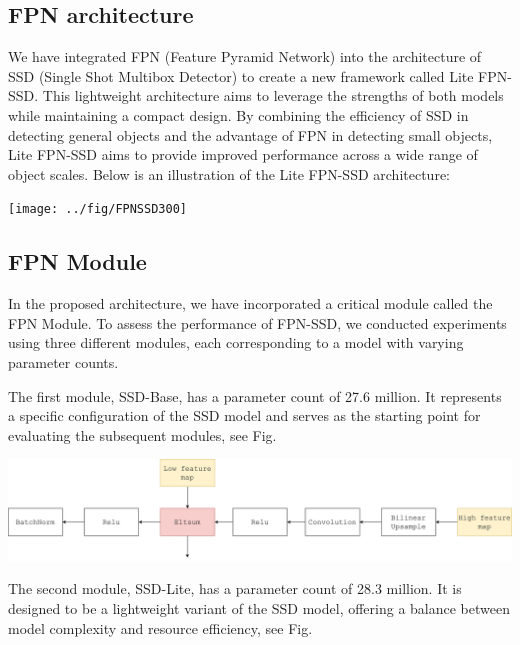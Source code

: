 \documentclass[a4paper]{article}
\begin{document}
	\subsection{FPN architecture}
	
	We have integrated FPN (Feature Pyramid Network) into the architecture of SSD (Single Shot Multibox Detector) to create a new framework called Lite FPN-SSD. This lightweight architecture aims to leverage the strengths of both models while maintaining a compact design. By combining the efficiency of SSD in detecting general objects and the advantage of FPN in detecting small objects, Lite FPN-SSD aims to provide improved performance across a wide range of object scales. Below is an illustration of the Lite FPN-SSD architecture:
	
	\begin{center}
		\texttt{[image: ../fig/FPNSSD300]}
		\label{LiteFPNSSDarchitecture}
	\end{center}
	
	
	\subsection{FPN Module}
	In the proposed architecture, we have incorporated a critical module called the FPN Module. To assess the performance of FPN-SSD, we conducted experiments using three different modules, each corresponding to a model with varying parameter counts.
	
	The first module, SSD-Base, has a parameter count of 27.6 million. It represents a specific configuration of the SSD model and serves as the starting point for evaluating the subsequent modules, see Fig.
	
	\begin{center}
		\includegraphics[width=1.1\linewidth]{../fig/Module_a}
		\label{modulea}
	\end{center}
	
	The second module, SSD-Lite, has a parameter count of 28.3 million. It is designed to be a lightweight variant of the SSD model, offering a balance between model complexity and resource efficiency, see Fig.
	
\end{document}
